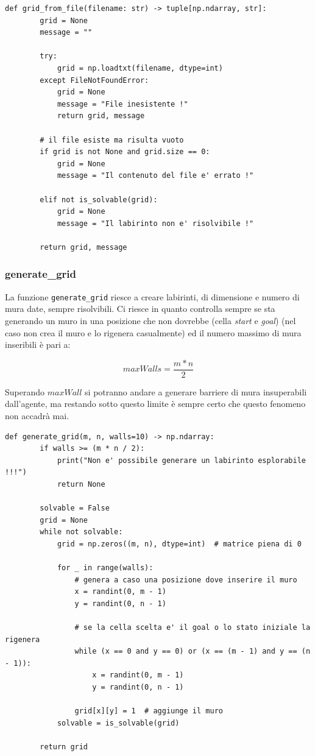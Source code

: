 \begin{lstlisting}[style=python, caption={Funzione per il caricamento in memoria di un labirinto da file}]
	def grid_from_file(filename: str) -> tuple[np.ndarray, str]:
		grid = None
		message = ""
	
		try:
			grid = np.loadtxt(filename, dtype=int)
		except FileNotFoundError:
			grid = None
			message = "File inesistente !"
			return grid, message
	
		# il file esiste ma risulta vuoto
		if grid is not None and grid.size == 0:
			grid = None
			message = "Il contenuto del file e' errato !"
	
		elif not is_solvable(grid):
			grid = None
			message = "Il labirinto non e' risolvibile !"
	
		return grid, message
\end{lstlisting}

\subsubsection{generate\_grid}
La funzione \lstinline[style=cmd]|generate_grid| riesce a creare labirinti, di dimensione e numero di mura date, sempre risolvibili. Ci riesce in quanto controlla sempre se sta generando un muro in una posizione che non dovrebbe (cella \textit{start} e \textit{goal}) (nel caso non crea il muro e lo rigenera casualmente) ed il numero massimo di mura inseribili \`{e} pari a: 

\[maxWalls = \frac{m * n}{2}\]

Superando $maxWall$ si potranno andare a generare barriere  di mura insuperabili dall'agente, ma restando sotto questo limite \`{e} sempre certo che questo fenomeno non accadr\`{a} mai.

\begin{lstlisting}[style=python, caption={Funzione per la generazione di labirinti casuali}]
	def generate_grid(m, n, walls=10) -> np.ndarray:
		if walls >= (m * n / 2):
			print("Non e' possibile generare un labirinto esplorabile !!!")
			return None
	
		solvable = False
		grid = None
		while not solvable:
			grid = np.zeros((m, n), dtype=int)  # matrice piena di 0
	
			for _ in range(walls):
				# genera a caso una posizione dove inserire il muro
				x = randint(0, m - 1)
				y = randint(0, n - 1)
	
				# se la cella scelta e' il goal o lo stato iniziale la rigenera
				while (x == 0 and y == 0) or (x == (m - 1) and y == (n - 1)):
					x = randint(0, m - 1)
					y = randint(0, n - 1)
	
				grid[x][y] = 1  # aggiunge il muro
			solvable = is_solvable(grid)
	
		return grid
\end{lstlisting}

